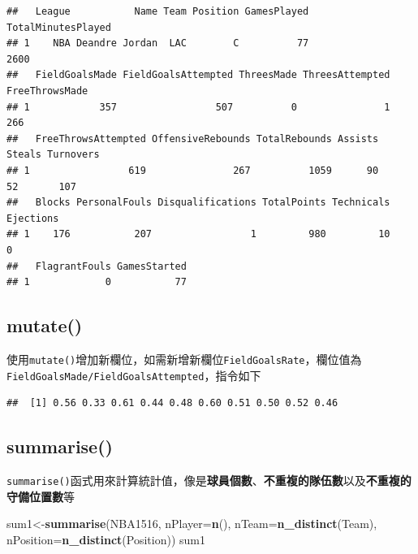 \documentclass[]{book}
\newenvironment{Shaded}{\begin{snugshade}}{\end{snugshade}}
\newcommand{\KeywordTok}[1]{\textcolor[rgb]{0.13,0.29,0.53}{\textbf{{#1}}}}
\newcommand{\DataTypeTok}[1]{\textcolor[rgb]{0.13,0.29,0.53}{{#1}}}
\newcommand{\DecValTok}[1]{\textcolor[rgb]{0.00,0.00,0.81}{{#1}}}
\newcommand{\NormalTok}[1]{{#1}}
\theoremstyle{definition}
\theoremstyle{definition}
\theoremstyle{remark}
\begin{document}
\begin{verbatim}
##   League           Name Team Position GamesPlayed TotalMinutesPlayed
## 1    NBA Deandre Jordan  LAC        C          77               2600
##   FieldGoalsMade FieldGoalsAttempted ThreesMade ThreesAttempted FreeThrowsMade
## 1            357                 507          0               1            266
##   FreeThrowsAttempted OffensiveRebounds TotalRebounds Assists Steals Turnovers
## 1                 619               267          1059      90     52       107
##   Blocks PersonalFouls Disqualifications TotalPoints Technicals Ejections
## 1    176           207                 1         980         10         0
##   FlagrantFouls GamesStarted
## 1             0           77
\end{verbatim}

\subsection{mutate()}\label{mutate}

使用\texttt{mutate()}增加新欄位，如需新增新欄位\texttt{FieldGoalsRate}，欄位值為\texttt{FieldGoalsMade/FieldGoalsAttempted}，指令如下

\begin{Shaded}
\end{Shaded}

\begin{verbatim}
##  [1] 0.56 0.33 0.61 0.44 0.48 0.60 0.51 0.50 0.52 0.46
\end{verbatim}

\subsection{summarise()}\label{summarise}

\texttt{summarise()}函式用來計算統計值，像是\textbf{球員個數}、\textbf{不重複的隊伍數}以及\textbf{不重複的守備位置數}等

\begin{Shaded}
\begin{Highlighting}[]
\NormalTok{sum1<-}\KeywordTok{summarise}\NormalTok{(NBA1516,}
                \DataTypeTok{nPlayer=}\KeywordTok{n}\NormalTok{(),}
                \DataTypeTok{nTeam=}\KeywordTok{n_distinct}\NormalTok{(Team),}
                \DataTypeTok{nPosition=}\KeywordTok{n_distinct}\NormalTok{(Position))}
\NormalTok{sum1}
\end{Highlighting}
\end{Shaded}
\end{document}
